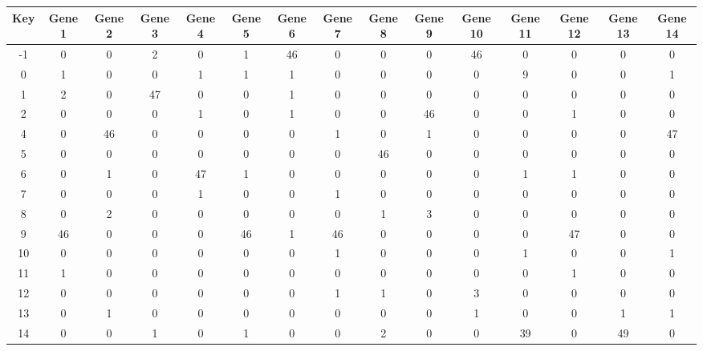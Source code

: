 \begin{tabular}{|c|c|c|c|c|c|c|c|c|c|c|c|c|c|c|}
\hline
Key & Gene 1 & Gene 2 & Gene 3 & Gene 4 & Gene 5 & Gene 6 & Gene 7 & Gene 8 & Gene 9 & Gene 10 & Gene 11 & Gene 12 & Gene 13 & Gene 14 \\
\hline
-1 & 0 & 0 & 2 & 0 & 1 & 46 & 0 & 0 & 0 & 46 & 0 & 0 & 0 & 0 \\
0 & 1 & 0 & 0 & 1 & 1 & 1 & 0 & 0 & 0 & 0 & 9 & 0 & 0 & 1 \\
1 & 2 & 0 & 47 & 0 & 0 & 1 & 0 & 0 & 0 & 0 & 0 & 0 & 0 & 0 \\
2 & 0 & 0 & 0 & 1 & 0 & 1 & 0 & 0 & 46 & 0 & 0 & 1 & 0 & 0 \\
4 & 0 & 46 & 0 & 0 & 0 & 0 & 1 & 0 & 1 & 0 & 0 & 0 & 0 & 47 \\
5 & 0 & 0 & 0 & 0 & 0 & 0 & 0 & 46 & 0 & 0 & 0 & 0 & 0 & 0 \\
6 & 0 & 1 & 0 & 47 & 1 & 0 & 0 & 0 & 0 & 0 & 1 & 1 & 0 & 0 \\
7 & 0 & 0 & 0 & 1 & 0 & 0 & 1 & 0 & 0 & 0 & 0 & 0 & 0 & 0 \\
8 & 0 & 2 & 0 & 0 & 0 & 0 & 0 & 1 & 3 & 0 & 0 & 0 & 0 & 0 \\
9 & 46 & 0 & 0 & 0 & 46 & 1 & 46 & 0 & 0 & 0 & 0 & 47 & 0 & 0 \\
10 & 0 & 0 & 0 & 0 & 0 & 0 & 1 & 0 & 0 & 0 & 1 & 0 & 0 & 1 \\
11 & 1 & 0 & 0 & 0 & 0 & 0 & 0 & 0 & 0 & 0 & 0 & 1 & 0 & 0 \\
12 & 0 & 0 & 0 & 0 & 0 & 0 & 1 & 1 & 0 & 3 & 0 & 0 & 0 & 0 \\
13 & 0 & 1 & 0 & 0 & 0 & 0 & 0 & 0 & 0 & 1 & 0 & 0 & 1 & 1 \\
14 & 0 & 0 & 1 & 0 & 1 & 0 & 0 & 2 & 0 & 0 & 39 & 0 & 49 & 0 \\
\hline
\end{tabular}